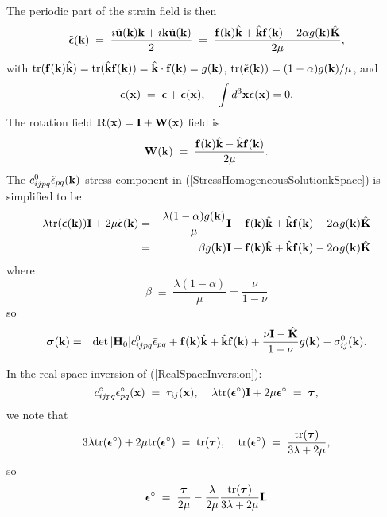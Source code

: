 \documentclass[12pt]{article}
\def\bmath#1{\mbox{\boldmath$#1$}}
\begin{document}
The periodic part of the strain field is then
\begin{equation}
 \tilde{\bmath{\epsilon}}({\bf k}) \;=\; \frac{i\tilde{\bf u}({\bf k}){\bf k}+i{\bf k}\tilde{\bf u}({\bf k})}{2} \;=\;
\frac{{\bf f}({\bf k})\hat{\bf k}+\hat{\bf k}{\bf f}({\bf k}) - 2\alpha g({\bf k})\hat{\bf K}}
 {2\mu},
\end{equation}
with ${\rm tr}({\bf f}({\bf k})\hat{\bf k})={\rm tr}(\hat{\bf k}{\bf
f}({\bf k}))=\hat{\bf k}\cdot {\bf f}({\bf k})=g({\bf k})$, ${\rm tr}(\tilde{\bmath{\epsilon}}({\bf k}))=(1-\alpha)g({\bf k})/\mu$, and
\begin{equation}
 \bmath{\epsilon}({\bf x}) \;=\; \bar{\bmath{\epsilon}} + 
 \tilde{\bmath{\epsilon}}({\bf x}), \;\;\;\;
 \int d^3{\bf x} \tilde{\bmath{\epsilon}}({\bf x}) = 0.
\end{equation}
The rotation field ${\bf R}({\bf x})={\bf I}+{\bf W}({\bf x})$ 
 field is
\begin{equation}
 {\bf W}({\bf k}) \;=\; 
\frac{{\bf f}({\bf k})\hat{\bf k}-\hat{\bf k}{\bf f}({\bf k})}
 {2\mu}.
\end{equation}
The $c_{ijpq}^0\tilde{\epsilon}_{pq}({\bf k})$
stress component in (\ref{StressHomogeneousSolutionkSpace}) is simplified to be
\begin{eqnarray}
 \lambda {\rm tr}(\tilde{\bmath{\epsilon}}({\bf k})){\bf I} + 2\mu \tilde{\bmath{\epsilon}}({\bf k})  =&&  
\frac{\lambda(1-\alpha)g({\bf k})}{\mu}{\bf I} + 
 {\bf f}({\bf k})\hat{\bf k}+\hat{\bf k}{\bf f}({\bf k}) - 2\alpha g({\bf k})\hat{\bf K} \nonumber\\
 =&& \beta g({\bf k}){\bf I} + {\bf f}({\bf k})\hat{\bf k}+\hat{\bf k}{\bf f}({\bf k}) - 2\alpha g({\bf k})\hat{\bf K}
\end{eqnarray}
where
\begin{equation}
 \beta \;\equiv\; \frac{\lambda(1-\alpha)}{\mu} = \frac{\nu}{1-\nu}
\end{equation}
so
\begin{eqnarray}
 \bmath{\sigma}({\bf k}) =&& \det|{\bf H}_0|c_{ijpq}^0\bar{\epsilon}_{pq} 
+ {\bf f}({\bf k})\hat{\bf k}+\hat{\bf k}{\bf f}({\bf k}) 
+ \frac{\nu{\bf I}-\hat{\bf K}}{1-\nu}g({\bf k})  - \sigma^0_{ij}({\bf k}).
\label{StressIsotropicHomogeneousSolutionkSpace}
\end{eqnarray}

In the real-space inversion of (\ref{RealSpaceInversion}):
\begin{equation}
 c^\circ_{ijpq} \epsilon^\circ_{pq}({\bf x}) 
 \;=\; \tau_{ij}({\bf x}), \;\;\;\;
 \lambda{\rm tr}(\bmath{\epsilon}^\circ){\bf I} + 
 2\mu\bmath{\epsilon}^\circ \;=\; \bmath{\tau},
\end{equation}
we note that
\begin{equation}
 3\lambda{\rm tr}(\bmath{\epsilon}^\circ) + 
 2\mu {\rm tr}(\bmath{\epsilon}^\circ)
\;=\; {\rm tr}(\bmath{\tau}), \;\;\;\;
 {\rm tr}(\bmath{\epsilon}^\circ) \;=\; 
 \frac{{\rm tr}(\bmath{\tau})}{3\lambda+2\mu},
\end{equation}
so 
\begin{equation}
  \bmath{\epsilon}^\circ \;=\; \frac{\bmath{\tau}}{2\mu} - 
  \frac{\lambda}{2\mu}
 \frac{{\rm tr}(\bmath{\tau})}{3\lambda+2\mu} {\bf I}.
\end{equation}
\end{document}
